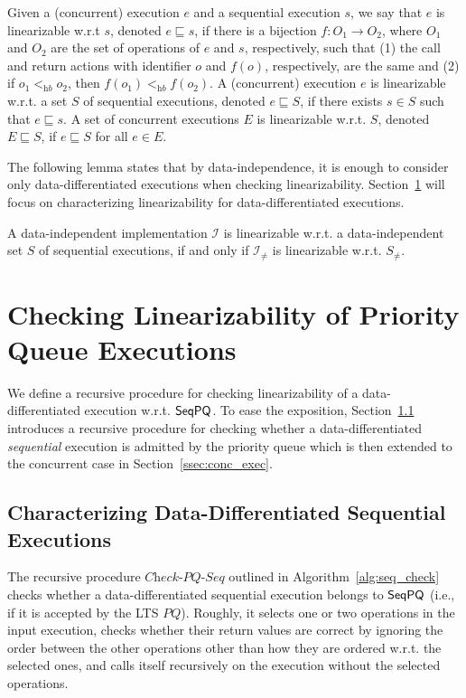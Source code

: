 \documentclass[a4paper,UKenglish]{lipics-v2016}
\begin{document}
Given a (concurrent) execution $e$ and a sequential execution $s$, we say that $e$ is linearizable w.r.t $s$, denoted $e \sqsubseteq s$, if there is a bijection $f: O_1 \rightarrow O_2$, where $O_1$ and $O_2$ are the set of operations of $e$ and $s$, respectively, such that (1) the call and return actions with identifier $o$ and $f(o)$, respectively, are the same
and (2) if $o_1 <_{\textit{hb}} o_2$, then $f(o_1) <_{\textit{hb}} f(o_2)$.
A (concurrent) execution $e$ is linearizable w.r.t. a set $S$ of sequential executions, denoted $e \sqsubseteq S$, if there exists $s \in S$ such that $e \sqsubseteq s$. A set of concurrent executions $E$ is linearizable w.r.t. $S$, denoted $E \sqsubseteq S$, if $e \sqsubseteq S$ for all $e \in E$.

The following lemma states that by data-independence, it is enough to consider only data-differentiated executions when checking linearizability. 
Section~\ref{sec:checking inclusion by recursive procedure} will focus on characterizing linearizability for data-differentiated executions. 

\begin{lemma}\label{lemma:data differentiated is enough for PQ}
A data-independent implementation $\mathcal{I}$ is linearizable w.r.t. a data-independent set $S$ of sequential executions, if and only if $\mathcal{I}_{\neq}$ is linearizable w.r.t. $S_{\neq}$.
\end{lemma}


 
\section{Checking Linearizability of Priority Queue Executions}
\label{sec:checking inclusion by recursive procedure}

We define a recursive procedure for checking linearizability of a data-differentiated execution w.r.t. $\mathsf{SeqPQ}$.
To ease the exposition, Section~\ref{ssec:seq_exec} introduces a recursive procedure for checking whether a data-differentiated \emph{sequential} execution is admitted by the priority queue which is then extended to the concurrent case in Section~\ref{ssec:conc_exec}.

\subsection{Characterizing Data-Differentiated Sequential Executions}\label{ssec:seq_exec}

The recursive procedure $\textit{Check-PQ-Seq}$ outlined in Algorithm~\ref{alg:seq_check} checks whether a data-differentiated sequential execution belongs to $\mathsf{SeqPQ}$ (i.e., if it is accepted by the LTS $PQ$).
 Roughly, it selects one or two operations in the input execution, checks whether their return values are correct by ignoring the order between the other operations other than how they are ordered w.r.t. the selected ones, and calls itself recursively on the execution without the selected operations. 
\end{document}
